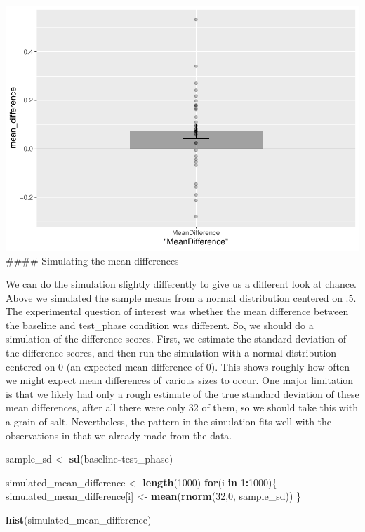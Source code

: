 \documentclass[]{book}
\newenvironment{Shaded}{\begin{snugshade}}{\end{snugshade}}
\newcommand{\KeywordTok}[1]{\textcolor[rgb]{0.13,0.29,0.53}{\textbf{#1}}}
\newcommand{\DecValTok}[1]{\textcolor[rgb]{0.00,0.00,0.81}{#1}}
\newcommand{\StringTok}[1]{\textcolor[rgb]{0.31,0.60,0.02}{#1}}
\newcommand{\ControlFlowTok}[1]{\textcolor[rgb]{0.13,0.29,0.53}{\textbf{#1}}}
\newcommand{\OperatorTok}[1]{\textcolor[rgb]{0.81,0.36,0.00}{\textbf{#1}}}
\newcommand{\NormalTok}[1]{#1}
\begin{document}
\includegraphics{Statistics_Lab_files/figure-latex/unnamed-chunk-180-1.pdf}
\#\#\#\# Simulating the mean differences

We can do the simulation slightly differently to give us a different
look at chance. Above we simulated the sample means from a normal
distribution centered on .5. The experimental question of interest was
whether the mean difference between the baseline and test\_phase
condition was different. So, we should do a simulation of the difference
scores. First, we estimate the standard deviation of the difference
scores, and then run the simulation with a normal distribution centered
on 0 (an expected mean difference of 0). This shows roughly how often we
might expect mean differences of various sizes to occur. One major
limitation is that we likely had only a rough estimate of the true
standard deviation of these mean differences, after all there were only
32 of them, so we should take this with a grain of salt. Nevertheless,
the pattern in the simulation fits well with the observations in that we
already made from the data.

\begin{Shaded}
\begin{Highlighting}[]
\NormalTok{sample_sd   <-}\StringTok{ }\KeywordTok{sd}\NormalTok{(baseline}\OperatorTok{-}\NormalTok{test_phase)}

\NormalTok{simulated_mean_difference <-}\StringTok{ }\KeywordTok{length}\NormalTok{(}\DecValTok{1000}\NormalTok{)}
\ControlFlowTok{for}\NormalTok{(i }\ControlFlowTok{in} \DecValTok{1}\OperatorTok{:}\DecValTok{1000}\NormalTok{)\{}
\NormalTok{ simulated_mean_difference[i] <-}\StringTok{ }\KeywordTok{mean}\NormalTok{(}\KeywordTok{rnorm}\NormalTok{(}\DecValTok{32}\NormalTok{,}\DecValTok{0}\NormalTok{, sample_sd))}
\NormalTok{\}}

\KeywordTok{hist}\NormalTok{(simulated_mean_difference)}
\end{Highlighting}
\end{Shaded}
\end{document}
